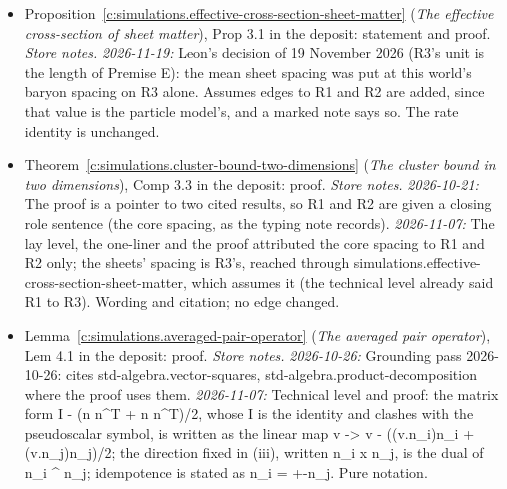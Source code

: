 \documentclass[11pt]{article}
\theoremstyle{definition}
\theoremstyle{plain}
\begin{document}
\begin{itemize}
\item Proposition~\ref{c:simulations.effective-cross-section-sheet-matter} (\emph{The effective cross-section of sheet matter}), Prop 3.1 in the deposit: statement and proof. \emph{Store notes.} \emph{2026-11-19:} Leon's decision of 19 November 2026 (R3's unit is the length of Premise E): the mean sheet spacing was put at this world's baryon spacing on R3 alone. Assumes edges to R1 and R2 are added, since that value is the particle model's, and a marked note says so. The rate identity is unchanged.
\item Theorem~\ref{c:simulations.cluster-bound-two-dimensions} (\emph{The cluster bound in two dimensions}), Comp 3.3 in the deposit: proof. \emph{Store notes.} \emph{2026-10-21:} The proof is a pointer to two cited results, so R1 and R2 are given a closing role sentence (the core spacing, as the typing note records). \emph{2026-11-07:} The lay level, the one-liner and the proof attributed the core spacing to R1 and R2 only; the sheets' spacing is R3's, reached through simulations.effective-cross-section-sheet-matter, which assumes it (the technical level already said R1 to R3). Wording and citation; no edge changed.
\item Lemma~\ref{c:simulations.averaged-pair-operator} (\emph{The averaged pair operator}), Lem 4.1 in the deposit: proof. \emph{Store notes.} \emph{2026-10-26:} Grounding pass 2026-10-26: cites std-algebra.vector-squares, std-algebra.product-decomposition where the proof uses them. \emph{2026-11-07:} Technical level and proof: the matrix form I - (n n\^{}T + n n\^{}T)/2, whose I is the identity and clashes with the pseudoscalar symbol, is written as the linear map v -> v - ((v.n\_i)n\_i + (v.n\_j)n\_j)/2; the direction fixed in (iii), written n\_i x n\_j, is the dual of n\_i \^{} n\_j; idempotence is stated as n\_i = +-n\_j. Pure notation.
\end{itemize}
\end{document}
